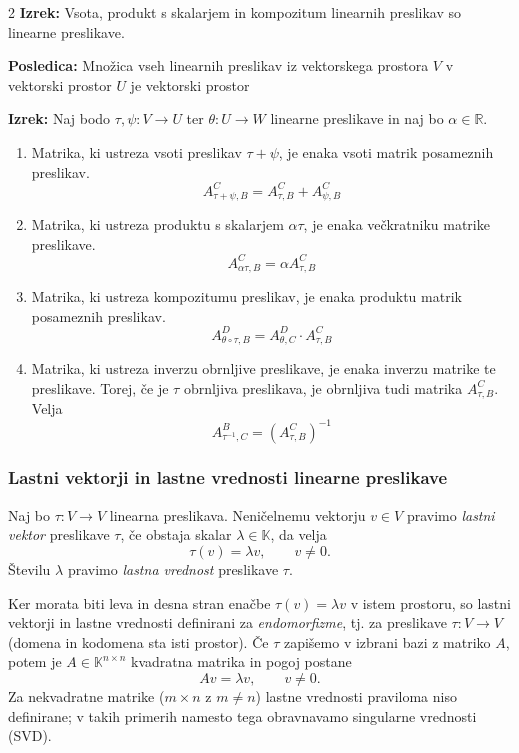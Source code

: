 \documentclass{article}
\begin{document}
\begin{multicols}{2}
	\textbf{Izrek:} Vsota, produkt s skalarjem in kompozitum linearnih preslikav so linearne preslikave.

	\textbf{Posledica:} Množica vseh linearnih preslikav iz vektorskega prostora \( V \) v vektorski prostor \( U \) je vektorski prostor

	\textbf{Izrek:} Naj bodo \( \tau, \psi: V \to U \) ter \( \theta: U \to W \) linearne preslikave in naj bo \( \alpha \in \mathbb{R} \).
	\begin{enumerate}
		\item Matrika, ki ustreza vsoti preslikav \( \tau + \psi \), je enaka vsoti matrik posameznih preslikav.
		      \[ A_{\tau+\psi,B}^C = A_{\tau,B}^C + A_{\psi,B}^C \]
		\item Matrika, ki ustreza produktu s skalarjem \( \alpha\tau \), je enaka večkratniku matrike preslikave.
		      \[ A_{\alpha\tau,B}^C = \alpha A_{\tau,B}^C \]
		\item Matrika, ki ustreza kompozitumu preslikav, je enaka produktu matrik posameznih preslikav.
		      \[ A_{\theta\circ\tau,B}^D = A_{\theta,C}^D \cdot A_{\tau,B}^C \]
		\item Matrika, ki ustreza inverzu obrnljive preslikave, je enaka inverzu matrike te preslikave. Torej, če je \( \tau \) obrnljiva preslikava, je obrnljiva tudi matrika \( A_{\tau,B}^C \). Velja
		      \[ A_{\tau^{-1},C}^B = (A_{\tau,B}^C)^{-1} \]
	\end{enumerate}

	\subsubsection{Lastni vektorji in lastne vrednosti linearne preslikave}

	Naj bo \(\tau: V \to V\) linearna preslikava. Neničelnemu vektorju \(v \in V\) pravimo \textit{lastni vektor} preslikave \(\tau\), če obstaja skalar \(\lambda \in \mathbb{K}\), da velja
	\[
		\tau(v) = \lambda v, \qquad v \neq 0.
	\]
	Številu \(\lambda\) pravimo \textit{lastna vrednost} preslikave \(\tau\).

	\medskip
	Ker morata biti leva in desna stran enačbe \(\tau(v)=\lambda v\) v istem prostoru, so lastni vektorji in lastne vrednosti definirani za \textit{endomorfizme}, tj. za preslikave \(\tau: V \to V\) (domena in kodomena sta isti prostor). Če \(\tau\) zapišemo v izbrani bazi z matriko \(A\), potem je \(A \in \mathbb{K}^{n\times n}\) kvadratna matrika in pogoj postane
	\[
		Av = \lambda v, \qquad v \neq 0.
	\]
	Za nekvadratne matrike (\(m \times n\) z \(m\neq n\)) lastne vrednosti praviloma niso definirane; v takih primerih namesto tega obravnavamo singularne vrednosti (SVD).



\end{multicols}
\end{document}
